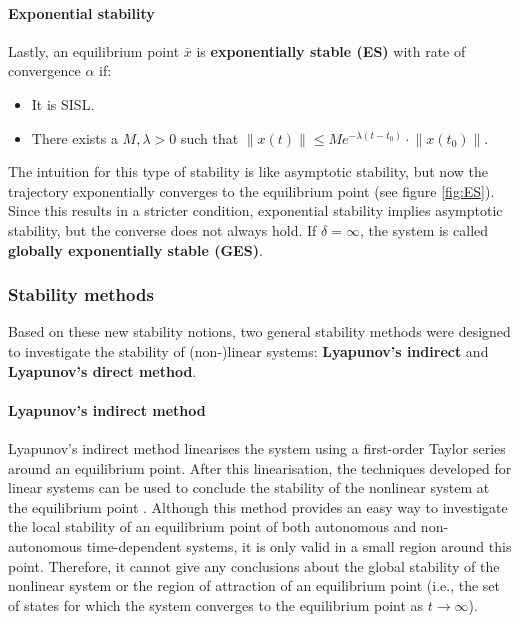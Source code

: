 \paragraph{Exponential stability}

Lastly, an equilibrium point $\bar{x}$ is \textbf{exponentially stable (ES)} with rate of convergence $\alpha$ if:
\begin{itemize}
  \item It is SISL.
  \item There exists a $M, \lambda > 0$ such that $\left\| x\left(t \right) \right\| \leq Me^{-\lambda\left(t-t_0 \right)}\cdot \left\| x\left(t_0\right) \right\|$.
\end{itemize}
The intuition for this type of stability is like asymptotic stability, but now the trajectory exponentially converges to the equilibrium point (see figure \ref{fig:ES}). Since this results in a stricter condition, exponential stability implies asymptotic stability, but the converse does not always hold. If $\delta = \infty$, the system is called \textbf{globally exponentially stable (GES)}.

\subsubsection{Stability methods}

Based on these new stability notions, two general stability methods were designed to investigate the stability of (non-)linear systems: \textbf{Lyapunov's indirect} and \textbf{Lyapunov's direct method}.

\paragraph{Lyapunov's indirect method}

Lyapunov's indirect method linearises the system using a first-order Taylor series around an equilibrium point. After this linearisation, the techniques developed for linear systems can be used to conclude the stability of the nonlinear system at the equilibrium point \cite{vidyasagarNonlinearSystemsAnalysis2002}. Although this method provides an easy way to investigate the local stability of an equilibrium point of both autonomous and non-autonomous time-dependent systems, it is only valid in a small region around this point. Therefore, it cannot give any conclusions about the global stability of the nonlinear system or the region of attraction of an equilibrium point (i.e., the set of states for which the system converges to the equilibrium point as $t \rightarrow \infty$).

